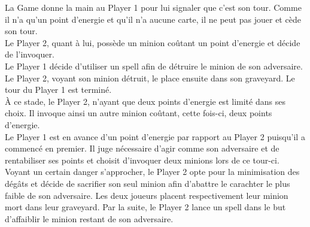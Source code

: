 La Game donne la main au Player 1 pour lui signaler que c'est son tour. Comme il n'a qu'un point d'energie et qu'il n'a aucune carte, il ne peut pas jouer et cède son tour.\\
Le Player 2, quant à lui, possède un minion coûtant un point d'energie et décide de l'invoquer.\\
Le Player 1 décide d'utiliser un spell afin de détruire le minion de son adversaire. Le Player 2, voyant son minion détruit, le place ensuite dans son graveyard. Le tour du Player 1 est terminé.\\
À ce stade, le Player 2, n'ayant que deux points d'energie est limité dans ses choix. Il invoque ainsi un autre minion coûtant, cette fois-ci, deux points d'energie.\\
Le Player 1 est en avance d'un point d'energie par rapport au Player 2 puisqu'il a commencé en premier. Il juge nécessaire d'agir comme son adversaire et de rentabiliser ses points et choisit d'invoquer deux minions lors de ce tour-ci.\\
Voyant un certain danger s'approcher, le Player 2 opte pour la minimisation des dégâts et décide de sacrifier son seul minion afin d'abattre le carachter le plus faible de son adversaire. Les deux joueurs placent respectivement leur minion mort dans leur graveyard. Par la suite, le Player 2 lance un spell dans le but d'affaiblir le minion restant de son adversaire.




